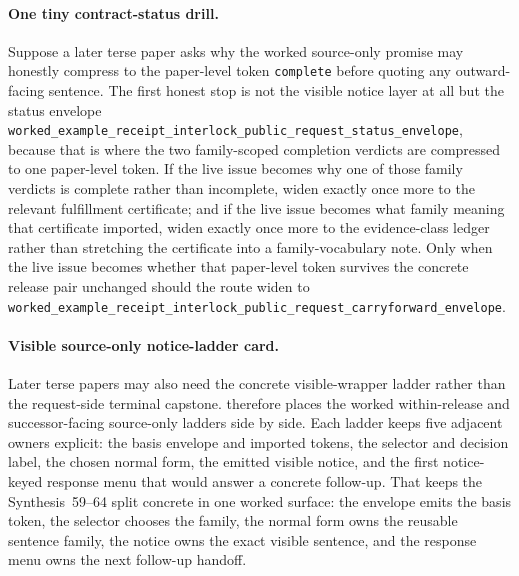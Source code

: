 \documentclass[11pt]{article}
\begin{document}
\paragraph{One tiny contract-status drill.}
Suppose a later terse paper asks why the worked source-only promise may honestly compress to the paper-level token \nolinkurl{complete} before quoting any outward-facing sentence.
The first honest stop is not the visible notice layer at all but the status envelope \nolinkurl{worked_example_receipt_interlock_public_request_status_envelope}, because that is where the two family-scoped completion verdicts are compressed to one paper-level token.
If the live issue becomes why one of those family verdicts is complete rather than incomplete, widen exactly once more to the relevant fulfillment certificate; and if the live issue becomes what family meaning that certificate imported, widen exactly once more to the evidence-class ledger rather than stretching the certificate into a family-vocabulary note.
Only when the live issue becomes whether that paper-level token survives the concrete release pair unchanged should the route widen to \nolinkurl{worked_example_receipt_interlock_public_request_carryforward_envelope}.\cite{series:requestfulfillmentcertificates,series:publicrequeststatusenvelopes,series:publicrequestcarryforward}

\paragraph{Visible source-only notice-ladder card.}
Later terse papers may also need the concrete visible-wrapper ladder rather than the request-side terminal capstone.
 therefore places the worked within-release and successor-facing source-only ladders side by side.
Each ladder keeps five adjacent owners explicit: the basis envelope and imported tokens, the selector and decision label, the chosen normal form, the emitted visible notice, and the first notice-keyed response menu that would answer a concrete follow-up.
That keeps the Synthesis~59--64 split concrete in one worked surface: the envelope emits the basis token, the selector chooses the family, the normal form owns the reusable sentence family, the notice owns the exact visible sentence, and the response menu owns the next follow-up handoff.\cite{series:publicrequeststatusenvelopes,series:publicrequestcarryforward,series:publicrequestnotices,series:publicrequestnoticenormalforms,series:publicrequestnoticeselections,series:publicrequestresponsemenus}
\end{document}
